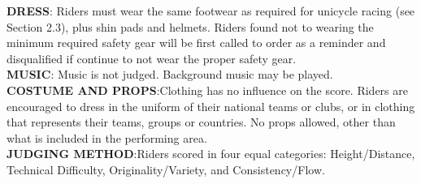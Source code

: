 \textbf{DRESS}: Riders must wear the same footwear as required for unicycle racing (see Section 2.3), plus shin pads and helmets.
Riders found not to wearing the minimum required safety gear will be first called to order as a reminder and
disqualified if continue to not wear the proper safety gear.\\
\textbf{MUSIC}: Music is not judged. Background music may be played.\\
\textbf{COSTUME AND PROPS}:Clothing has no influence on the score. Riders are encouraged to dress in the uniform of their national teams or clubs, or in clothing that represents their teams, groups or countries. No props allowed, other than what is included in the performing area.\\
\textbf{JUDGING METHOD}:Riders scored in four equal categories: Height/Distance, Technical Difficulty, Originality/Variety, and Consistency/Flow.\\

